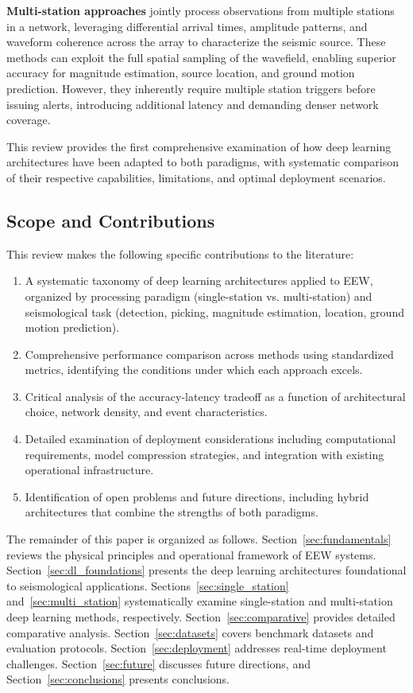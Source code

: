 \documentclass[review,authoryear]{elsarticle}
\begin{document}
\textbf{Multi-station approaches} jointly process observations from multiple stations in a network, leveraging differential arrival times, amplitude patterns, and waveform coherence across the array to characterize the seismic source. These methods can exploit the full spatial sampling of the wavefield, enabling superior accuracy for magnitude estimation, source location, and ground motion prediction. However, they inherently require multiple station triggers before issuing alerts, introducing additional latency and demanding denser network coverage.

This review provides the first comprehensive examination of how deep learning architectures have been adapted to both paradigms, with systematic comparison of their respective capabilities, limitations, and optimal deployment scenarios.

\subsection{Scope and Contributions}

This review makes the following specific contributions to the literature:

\begin{enumerate}
\item A systematic taxonomy of deep learning architectures applied to EEW, organized by processing paradigm (single-station vs. multi-station) and seismological task (detection, picking, magnitude estimation, location, ground motion prediction).
\item Comprehensive performance comparison across methods using standardized metrics, identifying the conditions under which each approach excels.
\item Critical analysis of the accuracy-latency tradeoff as a function of architectural choice, network density, and event characteristics.
\item Detailed examination of deployment considerations including computational requirements, model compression strategies, and integration with existing operational infrastructure.
\item Identification of open problems and future directions, including hybrid architectures that combine the strengths of both paradigms.
\end{enumerate}

The remainder of this paper is organized as follows. Section~\ref{sec:fundamentals} reviews the physical principles and operational framework of EEW systems. Section~\ref{sec:dl_foundations} presents the deep learning architectures foundational to seismological applications. Sections~\ref{sec:single_station} and~\ref{sec:multi_station} systematically examine single-station and multi-station deep learning methods, respectively. Section~\ref{sec:comparative} provides detailed comparative analysis. Section~\ref{sec:datasets} covers benchmark datasets and evaluation protocols. Section~\ref{sec:deployment} addresses real-time deployment challenges. Section~\ref{sec:future} discusses future directions, and Section~\ref{sec:conclusions} presents conclusions.
\end{document}
